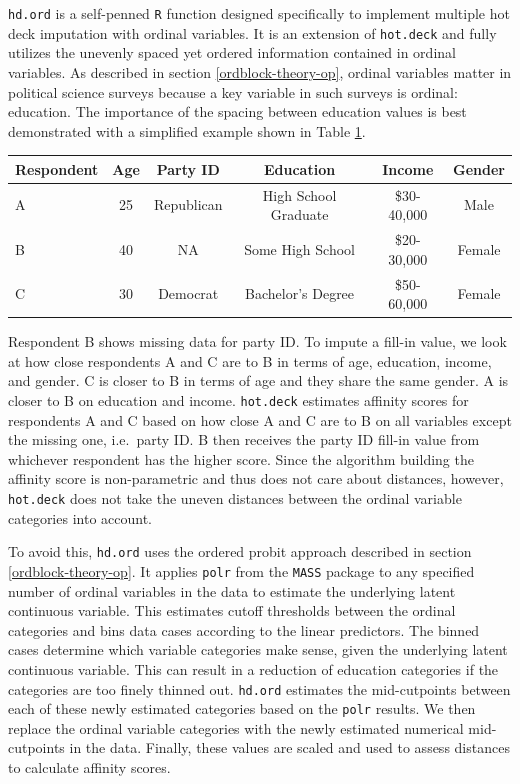 \documentclass[12pt,econ]{sources/authesis}
\makeatletter
\def\caption{\refstepcounter\@captype \@dblarg{\@caption\@captype}}
\makeatother
\begin{document}
\texttt{hd.ord} is a self-penned \texttt{R} function designed specifically to implement multiple hot deck imputation with ordinal variables. It is an extension of \texttt{hot.deck} and fully utilizes the unevenly spaced yet ordered information contained in ordinal variables. As described in section \ref{ordblock-theory-op}, ordinal variables matter in political science surveys because a key variable in such surveys is ordinal: education. The importance of the spacing between education values is best demonstrated with a simplified example shown in Table \ref{ordmiss-ordspace}.
\begin{table}[!htbp] 
  \centering
  \caption{Illustrative Data}
  \label{ordmiss-ordspace}
  \begin{tabular}{lccccc}
  \bottomrule 
  \midrule
  Respondent & Age & Party ID & Education & Income & Gender\\
  \hline
  A & 25 & Republican & High School Graduate & \$30-40,000 & Male \\
  B & 40 & NA & Some High School &  \$20-30,000 & Female\\
  C & 30 & Democrat & Bachelor's Degree &  \$50-60,000 & Female\\
  \bottomrule 
  \end{tabular}
\end{table}
Respondent B shows missing data for party ID. To impute a fill-in value, we look at how close respondents A and C are to B in terms of age, education, income, and gender. C is closer to B in terms of age and they share the same gender. A is closer to B on education and income. \texttt{hot.deck} estimates affinity scores for respondents A and C based on how close A and C are to B on all variables except the missing one, i.e.~party ID. B then receives the party ID fill-in value from whichever respondent has the higher score. Since the algorithm building the affinity score is non-parametric and thus does not care about distances, however, \texttt{hot.deck} does not take the uneven distances between the ordinal variable categories into account.

To avoid this, \texttt{hd.ord} uses the ordered probit approach described in section \ref{ordblock-theory-op}. It applies \texttt{polr} from the \texttt{MASS} package to any specified number of ordinal variables in the data to estimate the underlying latent continuous variable. This estimates cutoff thresholds between the ordinal categories and bins data cases according to the linear predictors. The binned cases determine which variable categories make sense, given the underlying latent continuous variable. This can result in a reduction of education categories if the categories are too finely thinned out. \texttt{hd.ord} estimates the mid-cutpoints between each of these newly estimated categories based on the \texttt{polr} results. We then replace the ordinal variable categories with the newly estimated numerical mid-cutpoints in the data. Finally, these values are scaled and used to assess distances to calculate affinity scores.
\end{document}

